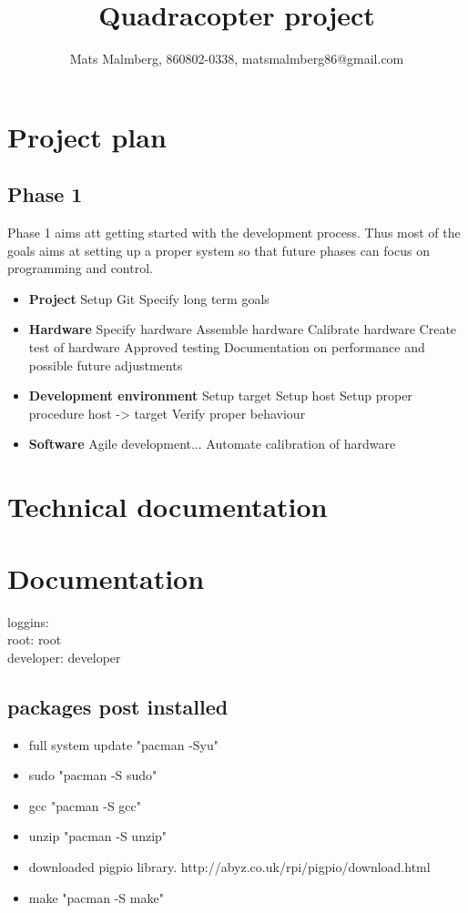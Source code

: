 \documentclass[12pt]{article}
\title{\center Quadracopter project}			%
\author{ Mats Malmberg, 860802-0338, matsmalmberg86@gmail.com}
\begin{document}
\maketitle			%

\section{Project plan}
\subsection{Phase 1}
Phase 1 aims att getting started with the development process. Thus most of the goals aims at setting up a proper system so that future phases can focus on programming and control. 
\begin{itemize}
\item[] \textbf{Project}
	\subitem{-} Setup Git
	\subitem{-} Specify long term goals
	
\item[] \textbf{Hardware}
	\subitem{-} Specify hardware
	\subitem{-} Assemble hardware
	\subitem{-} Calibrate hardware
	\subitem{-} Create test of hardware
	\subitem{-} Approved testing
	\subitem{-} Documentation on performance and possible future adjustments

\item[] \textbf{Development environment}
	\subitem{-} Setup target
	\subitem{-} Setup host
	\subitem{-} Setup proper procedure host -> target
	\subitem{-} Verify proper behaviour

\item[] \textbf{Software}
	\subitem{-} Agile development...
	\subitem{-} Automate calibration of hardware
\end{itemize}

\section{Technical documentation}

\section{Documentation}
loggins: \\
root: root\\
developer: developer\\
\subsection{packages post installed}
\begin{itemize}
\item full system update "pacman -Syu"
\item sudo "pacman -S sudo"
\item gcc "pacman -S gcc"
\item unzip "pacman -S unzip"
\item downloaded pigpio library. http://abyz.co.uk/rpi/pigpio/download.html
\item make "pacman -S make"
\end{itemize}
\end{document}
